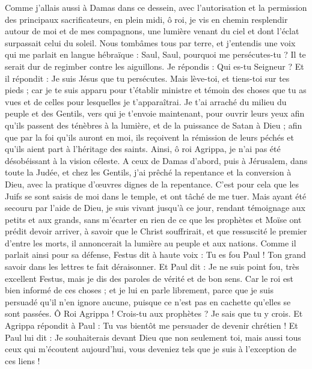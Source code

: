\begin{multicols}{2}
{{{Comme j'allais aussi à Damas dans ce dessein, avec l'autorisation et la permission des principaux sacrificateurs,
en plein midi, ô roi, je vis en chemin resplendir autour de moi et de mes compagnons, une lumière venant du ciel et dont l'éclat surpassait celui du soleil.
Nous tombâmes tous par terre, et j'entendis une voix qui me parlait en langue hébraïque : Saul, Saul, pourquoi me persécutes-tu ? Il te serait dur de regimber contre les aiguillons.
Je répondis : Qui es-tu Seigneur ? Et il répondit : Je suis Jésus que tu persécutes.
Mais lève-toi, et tiens-toi sur tes pieds ; car je te suis apparu pour t'établir ministre et témoin des choses que tu as vues et de celles pour lesquelles je t'apparaîtrai.
Je t'ai arraché du milieu du peuple et des Gentils, vers qui je t'envoie maintenant,
pour ouvrir leurs yeux afin qu'ils passent des ténèbres à la lumière, et de la puissance de Satan à Dieu ; afin que par la foi qu'ils auront en moi, ils reçoivent la rémission de leurs péchés et qu'ils aient part à l'héritage des saints.
Ainsi, ô roi Agrippa, je n'ai pas été désobéissant à la vision céleste.
A ceux de Damas d'abord, puis à Jérusalem, dans toute la Judée, et chez les Gentils, j'ai prêché la repentance et la conversion à Dieu, avec la pratique d'œuvres dignes de la repentance.
C'est pour cela que les Juifs se sont saisis de moi dans le temple, et ont tâché de me tuer.
Mais ayant été secouru par l'aide de Dieu, je suis vivant jusqu'à ce jour, rendant témoignage aux petits et aux grands, sans m'écarter en rien de ce que les prophètes et Moïse ont prédit devoir arriver,
à savoir que le Christ souffrirait, et que ressuscité le premier d'entre les morts, il annoncerait la lumière au peuple et aux nations.
Comme il parlait ainsi pour sa défense, Festus dit à haute voix : Tu es fou Paul ! Ton grand savoir dans les lettres te fait déraisonner.
Et Paul dit : Je ne suis point fou, très excellent Festus, mais je dis des paroles de vérité et de bon sens.
Car le roi est bien informé de ces choses ; et je lui en parle librement, parce que je suis persuadé qu'il n'en ignore aucune, puisque ce n'est pas en cachette qu'elles se sont passées.
Ô Roi Agrippa ! Crois-tu aux prophètes ? Je sais que tu y crois.
Et Agrippa répondit à Paul : Tu vas bientôt me persuader de devenir chrétien !
Et Paul lui dit : Je souhaiterais devant Dieu que non seulement toi, mais aussi tous ceux qui m'écoutent aujourd'hui, vous deveniez tels que je suis à l'exception de ces liens !
}}}
\end{multicols}
